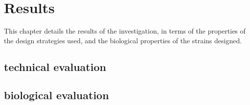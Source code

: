\chapter{Results}
This chapter details the results of the investigation, in terms of the properties of the design strategies used, and the biological properties of the strains designed.

\section{technical evaluation}

\section{biological evaluation}
